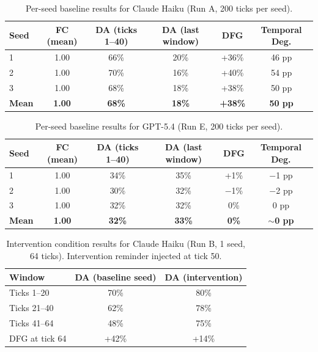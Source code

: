 \documentclass{article}
\begin{document}
\begin{table}[h]
\centering
\caption{Per-seed baseline results for Claude Haiku (Run A, 200 ticks
per seed).}
\label{tab:haiku_seeds}
\begin{tabular}{@{}lccccc@{}}
\toprule
\textbf{Seed} & \textbf{FC (mean)} & \textbf{DA (ticks 1--40)} &
\textbf{DA (last window)} & \textbf{DFG} & \textbf{Temporal Deg.} \\
\midrule
1 & 1.00 & 66\% & 20\% & +36\% & 46 pp \\
2 & 1.00 & 70\% & 16\% & +40\% & 54 pp \\
3 & 1.00 & 68\% & 18\% & +38\% & 50 pp \\
\midrule
\textbf{Mean} & \textbf{1.00} & \textbf{68\%} & \textbf{18\%} &
\textbf{+38\%} & \textbf{50 pp} \\
\bottomrule
\end{tabular}
\end{table}

\begin{table}[h]
\centering
\caption{Per-seed baseline results for GPT-5.4 (Run E, 200 ticks per
seed).}
\label{tab:gpt_seeds}
\begin{tabular}{@{}lccccc@{}}
\toprule
\textbf{Seed} & \textbf{FC (mean)} & \textbf{DA (ticks 1--40)} &
\textbf{DA (last window)} & \textbf{DFG} & \textbf{Temporal Deg.} \\
\midrule
1 & 1.00 & 34\% & 35\% & +1\% & $-$1 pp \\
2 & 1.00 & 30\% & 32\% & $-$1\% & $-$2 pp \\
3 & 1.00 & 32\% & 32\% & 0\% & 0 pp \\
\midrule
\textbf{Mean} & \textbf{1.00} & \textbf{32\%} & \textbf{33\%} &
\textbf{0\%} & \textbf{$\sim$0 pp} \\
\bottomrule
\end{tabular}
\end{table}

\begin{table}[h]
\centering
\caption{Intervention condition results for Claude Haiku (Run B, 1 seed,
64 ticks). Intervention reminder injected at tick 50.}
\label{tab:intervention_detail}
\begin{tabular}{@{}lcc@{}}
\toprule
\textbf{Window} & \textbf{DA (baseline seed)} & \textbf{DA
(intervention)} \\
\midrule
Ticks 1--20   & 70\% & 80\% \\
Ticks 21--40  & 62\% & 78\% \\
Ticks 41--64  & 48\% & 75\% \\
\midrule
DFG at tick 64 & +42\% & +14\% \\
\bottomrule
\end{tabular}
\end{table}
\end{document}
